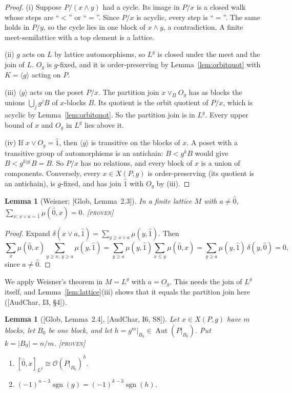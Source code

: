 \documentclass[11pt]{article}
\newtheorem{lemma}[theorem]{Lemma}
\theoremstyle{definition}
\theoremstyle{remark}
\newcommand{\OP}{\mathcal O}
\newcommand{\Aut}{\operatorname{Aut}}
\newcommand{\sgn}{\operatorname{sgn}}
\newcommand{\st}[1]{\textup{[\textsc{#1}]}}
\begin{document}
\begin{proof}
(i) Suppose $P/(x\wedge y)$ had a cycle. Its image in $P/x$ is a closed walk
whose steps are ``$<$'' or ``$=$''. Since $P/x$ is acyclic, every step is
``$=$''. The same holds in $P/y$, so the cycle lies in one block of
$x\wedge y$, a contradiction. A finite meet-semilattice with a top element is
a lattice.

(ii) $g$ acts on $L$ by lattice automorphisms, so $L^g$ is closed under the
meet and the join of $L$. $O_g$ is $g$-fixed, and it is order-preserving by
Lemma~\ref{lem:orbitquot} with $K=\langle g\rangle$ acting on $P$.

(iii) $\langle g\rangle$ acts on the poset $P/x$. The partition join
$x\vee_\Pi O_g$ has as blocks the unions $\bigcup_jg^jB$ of $x$-blocks $B$.
Its quotient is the orbit quotient of $P/x$, which is acyclic by
Lemma~\ref{lem:orbitquot}. So the partition join is in $L^g$. Every upper
bound of $x$ and $O_g$ in $L^g$ lies above it.

(iv) If $x\vee O_g=\hat1$, then $\langle g\rangle$ is transitive on the blocks
of $x$. A poset with a transitive group of automorphisms is an antichain:
$B<g^kB$ would give $B<g^{k|g|}B=B$. So $P/x$ has no relations, and every
block of $x$ is a union of components. Conversely, every $x\in X(P,g)$ is
order-preserving (its quotient is an antichain), is $g$-fixed, and has join
$\hat1$ with $O_g$ by (iii).
\end{proof}

\begin{lemma}[Weisner; {[Glob, Lemma~2.3]}]\label{lem:weisner}
In a finite lattice $M$ with $a\ne\hat0$,
$\sum_{x:\,x\vee a=\hat1}\mu(\hat0,x)=0$. \st{proven}
\end{lemma}

\begin{proof}
Expand $\delta(x\vee a,\hat1)=\sum_{y\ge x\vee a}\mu(y,\hat1)$. Then
\[
\sum_x\mu(\hat0,x)\sum_{y\ge x,\,y\ge a}\mu(y,\hat1)
=\sum_{y\ge a}\mu(y,\hat1)\sum_{x\le y}\mu(\hat0,x)
=\sum_{y\ge a}\mu(y,\hat1)\,\delta(y,\hat0)=0,
\]
since $a\ne\hat0$.
\end{proof}

We apply Weisner's theorem in $M=L^g$ with $a=O_g$. This needs the join of
$L^g$ itself, and Lemma~\ref{lem:lattice}(iii) shows that it equals the
partition join here ([AudChar, I3, \S4]).

\begin{lemma}[{[Glob, Lemma~2.4]}, {[AudChar, I6, S8]}]\label{lem:interval}
Let $x\in X(P,g)$ have $m$ blocks, let $B_0$ be one block, and let
$h=g^m|_{B_0}\in\Aut(P|_{B_0})$. Put $k=|B_0|=n/m$. \st{proven}
\begin{enumerate}[label=(\roman*)]
\item $[\hat0,x]_{L^g}\cong\OP(P|_{B_0})^h$.
\item $(-1)^{n-3}\sgn(g)=(-1)^{k-3}\sgn(h)$.
\end{enumerate}
\end{lemma}
\end{document}
